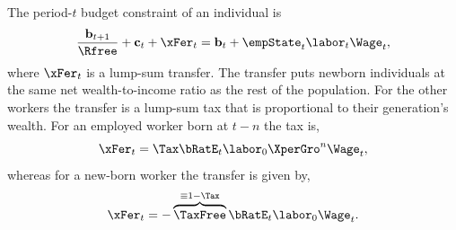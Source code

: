 \documentclass[titlepage]{\econtex}\newcommand{\texname}{cjSOE}
\begin{document}
The period-$t$ budget constraint of an individual is
\begin{equation*}
\frac{\bLev_{t+1}}{\Rfree}+ \cLev_{t}+\xFer_{t}=\bLev_{t}+\empState_{t} \labor_{t} \Wage_t,
\label{eq:ibcStakes}
\end{equation*}
where $\xFer_{t}$ is a lump-sum transfer. The transfer puts newborn individuals at the same net wealth-to-income ratio as the rest of the population. For the other workers the transfer is a lump-sum tax that is proportional to their generation's wealth. For an employed worker born at $t-n$ the tax is,
\begin{equation}
\xFer_{t}=\Tax \bRatE_t \labor_0 \XperGro^{n} \Wage_t, \label{eq:xFerE}
\end{equation}
whereas for a new-born worker the transfer is given by,
\begin{equation}
\xFer_{t}=-\overbrace{\TaxFree}^{\equiv 1-\Tax} \bRatE_t \labor_0 \Wage_t. \label{eq:xFerAtBirth}
\end{equation}
\end{document}
